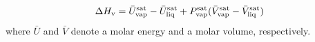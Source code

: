\documentclass[journal=jced,manuscript=article]{achemso}
\begin{document}
\begin{equation}
\Delta H_{\rm v} = \bar U_{\rm vap}^{\rm sat} - \bar U_{\rm liq}^{\rm sat} + P_{\rm vap}^{\rm sat} (\bar V_{\rm vap}^{\rm sat} - \bar V_{\rm liq}^{\rm sat})
\end{equation}
where $\bar U$ and $\bar V$ denote a molar energy and a molar volume, respectively.



\end{document}
